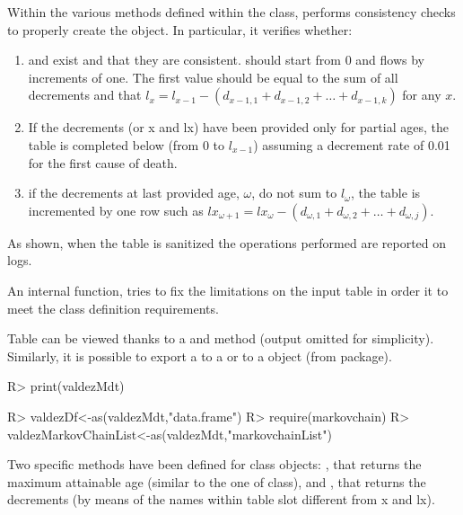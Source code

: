 \documentclass[nojss]{jss}
\begin{document}
Within the various methods defined within the  class,
 performs consistency checks to properly create the 
object. In particular, it verifies whether:
\begin{enumerate}
  \item {} and  exist and that they are consistent. 
  should start from 0 and flows by increments of one. The first  value should be
  equal to the sum of all decrements and that $l_{x}=l_{x-1}-\left( d_{x-1,1} +
  d_{x-1,2} + \ldots + d_{x-1,k} \right)$ for any $x$.
  \item If the decrements (or x and lx) have been provided only for partial
  ages, the table is completed below (from 0 to $l_{x-1}$) assuming a decrement
  rate of 0.01 for the first cause of death.
  \item if the decrements at last provided age, $\omega$, do not sum to
  $l_{\omega}$, the table is incremented by one row such as $lx_{\omega+1}=lx_{\omega}-\left( d_{\omega,1} + d_{\omega,2} + 
  \ldots + d_{\omega,j} \right)$.
 \end{enumerate}

As shown, when the table is sanitized the operations performed are reported on
logs.

 An internal function,  tries to fix the limitations on
 the input table in order it to meet the class definition requirements.
 
 Table can be viewed thanks to a  and  method (output omitted for simplicity). Similarly, it is possible to export a  to a  or to a  object (from  package).
 
\begin{Schunk}
\begin{Sinput}
R> print(valdezMdt)
\end{Sinput}
\end{Schunk}

 
\begin{Schunk}
\begin{Sinput}
R> valdezDf<-as(valdezMdt,"data.frame")
R> require(markovchain)
R> valdezMarkovChainList<-as(valdezMdt,"markovchainList")
\end{Sinput}
\end{Schunk}

Two specific methods have been defined for  class objects:
, that returns the maximum attainable age (similar to the one of
 class), and , that returns the decrements (by means of the names within table 
slot different from x and lx).
\end{document}
